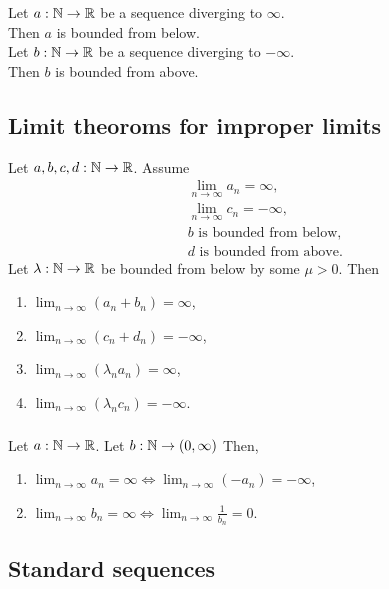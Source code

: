 \subsubsection*{}
\uprop Let $a : \mathbb{N} \to \mathbb{R}$ be a sequence diverging to $\infty$.\\
Then $a$ is bounded from below.\\

Let $b : \mathbb{N} \to \mathbb{R}$ be a sequence diverging to $-\infty$.\\
Then $b$ is bounded from above.\\


\subsection{Limit theoroms for improper limits}
\uthm Let $a,b,c,d : \mathbb{N} \to \mathbb{R}$. Assume
\begin{align*}
    &\lim_{n \to \infty} a_n = \infty,\\
    &\lim_{n \to \infty} c_n = -\infty,\\
    &\text{$b$ is bounded from below},\\
    &\text{$d$ is bounded from above}.
\end{align*}
Let $\lambda : \mathbb{N} \to \mathbb{R}$ be bounded from below by some $\mu > 0$.
Then
\begin{enumerate}
    \item $\lim_{n \to \infty} (a_n + b_n) = \infty$,
    \item $\lim_{n \to \infty} (c_n + d_n) = -\infty$,
    \item $\lim_{n \to \infty} (\lambda_n a_n) = \infty$,
    \item $\lim_{n \to \infty} (\lambda_n c_n) = -\infty$.
\end{enumerate}


\subsubsection*{}
\uprop Let $a : \mathbb{N} \to \mathbb{R}$. Let $b : \mathbb{N} \to (0, \infty)$ Then,
\begin{enumerate}
    \item $\lim_{n \to \infty} a_n = \infty \iff \lim_{n \to \infty} (-a_n) = -\infty$,
    \item $\lim_{n \to \infty} b_n = \infty \iff \lim_{n \to \infty} \frac{1}{b_n} = 0$.
\end{enumerate}


\subsection{Standard sequences}

